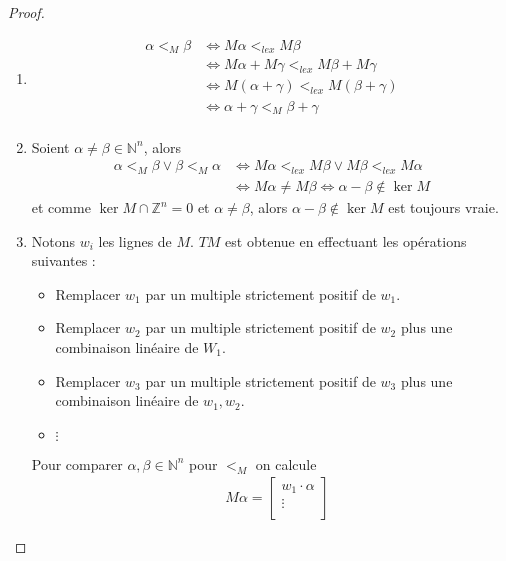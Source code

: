         \begin{proof}
            \begin{enumerate}
                \item
                \begin{align*}
                    \alpha <_M \beta &\iff M \alpha <_{lex} M \beta \\
                    &\iff M \alpha + M \gamma <_{lex} M \beta + M \gamma \\
                    &\iff M(\alpha + \gamma) <_{lex} M(\beta + \gamma) \\
                    &\iff \alpha + \gamma <_M \beta + \gamma \\ 
                \end{align*}
                \item Soient $\alpha \neq \beta \in \mathbb{N}^n$, alors
                \begin{align*}
                    \alpha <_M \beta \lor \beta <_M \alpha &\iff M \alpha <_{lex} M \beta \lor M \beta <_{lex} M \alpha \\
                    &\iff M \alpha \neq M \beta \iff \alpha - \beta \notin \ker M
                \end{align*}
                et comme $\ker M \cap \mathbb{Z}^n = 0$ et $\alpha \neq \beta$, alors $\alpha - \beta \notin \ker M$ est toujours vraie.
                \item Notons $w_i$ les lignes de $M$. $TM$ est obtenue en effectuant les opérations suivantes :
                \begin{itemize}
                    \item Remplacer $w_1$ par un multiple strictement positif de $w_1$.
                    \item Remplacer $w_2$ par un multiple strictement positif de $w_2$ plus une combinaison linéaire de $W_1$.
                    \item Remplacer $w_3$ par un multiple strictement positif de $w_3$ plus une combinaison linéaire de $w_1, w_2$.
                    \item $\vdots$
                \end{itemize}
                Pour comparer $\alpha, \beta \in \mathbb{N}^n$ pour $<_M$ on calcule
                \begin{align*}
                    &M \alpha =
                    \begin{bmatrix}
                        w_1 \cdot \alpha \\
                        \vdots \\

\end{bmatrix}
\end{align*}
\end{enumerate}
\end{proof}
